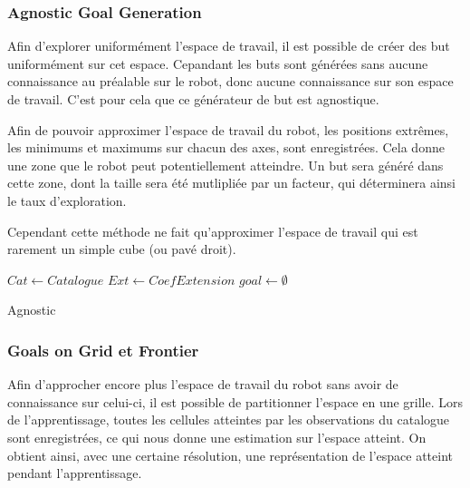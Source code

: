 \documentclass[11pt,french]{report}
\begin{document}
\subsubsection{Agnostic Goal Generation}

Afin d'explorer uniformément l'espace de travail, il est possible de créer des but uniformément sur cet espace.
Cepandant les buts sont générées sans aucune connaissance au préalable sur le robot, donc aucune connaissance sur son espace de travail.
C'est pour cela que ce générateur de but est agnostique.

\phantom{INVISIBLE LINE}

Afin de pouvoir approximer l'espace de travail du robot, les positions extrêmes, les minimums et maximums sur chacun des axes, sont enregistrées.
Cela donne une zone que le robot peut potentiellement atteindre.
Un but sera généré dans cette zone, dont la taille sera été mutlipliée par un facteur, qui déterminera ainsi le taux d'exploration.

\phantom{INVISIBLE LINE}

Cependant cette méthode ne fait qu'approximer l'espace de travail qui est rarement un simple cube (ou pavé droit).

\begin{algorithm}[h]
    \DontPrintSemicolon
    \LinesNumbered
    $Cat \leftarrow Catalogue$ \;
    $Ext \leftarrow CoefExtension$ \;
    $goal \leftarrow \emptyset$ \;
    \caption{\label{alg:Agnostic} Agnostic}
\end{algorithm}

\subsubsection{Goals on Grid et Frontier}

Afin d'approcher encore plus l'espace de travail du robot sans avoir de connaissance sur celui-ci, il est possible de partitionner l'espace en une grille.
Lors de l'apprentissage, toutes les cellules atteintes par les observations du catalogue sont enregistrées, ce qui nous donne une estimation sur l'espace atteint.
On obtient ainsi, avec une certaine résolution, une représentation de l'espace atteint pendant l'apprentissage.
\end{document}
